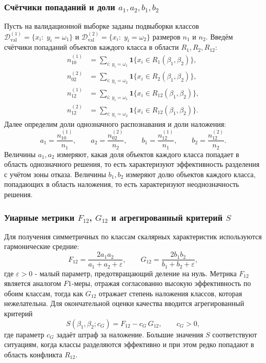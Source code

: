 \documentclass[12pt,a4paper]{article}
\begin{document}
\subsubsection{Счётчики попаданий и доли $a_1,a_2,b_1,b_2$}
Пусть на валидационной выборке заданы подвыборки классов
$\mathcal{D}^{(1)}_{\mathrm{val}}=\{x_i:\; y_i=\omega_1\}$ и
$\mathcal{D}^{(2)}_{\mathrm{val}}=\{x_i:\; y_i=\omega_2\}$ размеров $n_1$ и $n_2$.
Введём счётчики попаданий объектов каждого класса в области $R_1,R_2,R_{12}$:
\begin{align}
n_{10}^{(1)} &= \sum_{i:\,y_i=\omega_1} \mathbf{1}\{x_i\in R_1(\beta_1,\beta_2)\},\\
n_{02}^{(2)} &= \sum_{i:\,y_i=\omega_2} \mathbf{1}\{x_i\in R_2(\beta_1,\beta_2)\},\\
n_{12}^{(1)} &= \sum_{i:\,y_i=\omega_1} \mathbf{1}\{x_i\in R_{12}(\beta_1,\beta_2)\},\\
n_{12}^{(2)} &= \sum_{i:\,y_i=\omega_2} \mathbf{1}\{x_i\in R_{12}(\beta_1,\beta_2)\}.
\end{align}
Далее определим доли однозначного распознавания и доли наложения:
\begin{equation}
a_1=\frac{n_{10}^{(1)}}{n_1},\qquad a_2=\frac{n_{02}^{(2)}}{n_2},\qquad
b_1=\frac{n_{12}^{(1)}}{n_1},\qquad b_2=\frac{n_{12}^{(2)}}{n_2}.
\end{equation}
Величины $a_1,a_2$ измеряют, какая доля объектов каждого класса попадает в область
однозначного решения, то есть характеризуют эффективность разделения с учётом зоны отказа.
Величины $b_1,b_2$ измеряют долю объектов каждого класса, попадающих в область наложения,
то есть характеризуют неоднозначность решения.

\subsubsection{Унарные метрики $F_{12}$, $G_{12}$ и агрегированный критерий $S$}
Для получения симметричных по классам скалярных характеристик используются гармонические средние:
\begin{equation}
F_{12}=\frac{2a_1a_2}{a_1+a_2+\varepsilon},\qquad
G_{12}=\frac{2b_1b_2}{b_1+b_2+\varepsilon},
\end{equation}
где $\varepsilon>0$ - малый параметр, предотвращающий деление на нуль.
Метрика $F_{12}$ является аналогом $F1$-меры, отражая согласованно высокую эффективность
по обоим классам, тогда как $G_{12}$ отражает степень наложения классов, которая нежелательна.
Для окончательной оценки качества вводится агрегированный критерий
\begin{equation}
S(\beta_1,\beta_2;c_G)=F_{12}-c_G\,G_{12},\qquad c_G>0,
\end{equation}
где параметр $c_G$ задаёт штраф за наложение. Большие значения $S$ соответствуют ситуациям,
когда классы разделяются эффективно и при этом редко попадают в область конфликта $R_{12}$.
\end{document}
